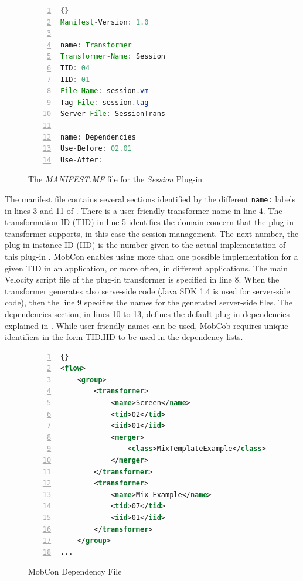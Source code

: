 \begin{figure}[ht]
	\begin{center}
	\begin{minipage}[t]{6cm}
		\begin{scriptsize}
		\begin{lstlisting}[numbers=left,language=Java,frame=leftline]{}
Manifest-Version: 1.0

name: Transformer
Transformer-Name: Session
TID: 04
IID: 01
File-Name: session.vm
Tag-File: session.tag
Server-File: SessionTrans

name: Dependencies
Use-Before: 02.01
Use-After: 		
		\end{lstlisting}
		\end{scriptsize}
		\end{minipage}
	\end{center}
	\caption{The \textit{MANIFEST.MF} file for the \textit{Session} Plug-in}
	\label{fig:mc.manifest}
\end{figure}

The manifest file contains several sections identified by the different \texttt{name:} labels in lines 3 and 11 of . There is a user friendly transformer name in line 4. The transformation ID (TID) in line 5 identifies the domain concern that the plug-in transformer supports, in this case the session management. The next number, the plug-in instance ID (IID) is the number given to the actual implementation of this plug-in . MobCon enables using more than one possible implementation for a given TID in an application, or more often, in different applications. The main Velocity script file of the plug-in transformer is specified in line 8. When the transformer generates also serve-side code (Java SDK 1.4 is used for server-side code), then the line 9 specifies the names for the generated server-side files. The dependencies section, in lines 10 to 13, defines the default plug-in dependencies explained in . While user-friendly names can be used, MobCob requires unique identifiers in the form TID.IID to be used in the dependency lists.

\begin{figure}[ht]
	\begin{center}
	\begin{minipage}[t]{6cm}
		\begin{scriptsize}
		\begin{lstlisting}[numbers=left,language=XML,frame=leftline]{}
<flow>
    <group>
        <transformer>
            <name>Screen</name>
            <tid>02</tid>
            <iid>01</iid>    
            <merger>
                <class>MixTemplateExample</class>            
            </merger>
        </transformer>
        <transformer>
            <name>Mix Example</name>
            <tid>07</tid>
            <iid>01</iid>
        </transformer>      
    </group>
...
		\end{lstlisting}
		\end{scriptsize}
		\end{minipage}
	\end{center}
	\caption{MobCon Dependency File}
	\label{fig:mc.dep}
\end{figure}

